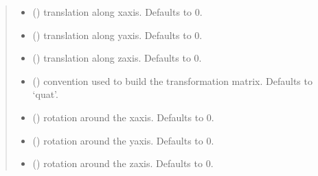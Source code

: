 \documentclass[letterpaper,10pt,english]{sphinxmanual}
\begin{document}
\begin{fulllineitems}
\begin{quote}
\begin{description}
\begin{itemize}
\item {} 
 (\sphinxstyleliteralemphasis{\sphinxupquote{, }}) \textendash{} translation along x\sphinxhyphen{}axis. Defaults to 0.

\item {} 
 (\sphinxstyleliteralemphasis{\sphinxupquote{, }}) \textendash{} translation along y\sphinxhyphen{}axis. Defaults to 0.

\item {} 
 (\sphinxstyleliteralemphasis{\sphinxupquote{, }}) \textendash{} translation along z\sphinxhyphen{}axis. Defaults to 0.

\item {} 
 (\sphinxstyleliteralemphasis{\sphinxupquote{, }}) \textendash{} convention used to build the transformation matrix. Defaults to ‘quat’.

\item {} 
 (\sphinxstyleliteralemphasis{\sphinxupquote{, }}) \textendash{} rotation around the x\sphinxhyphen{}axis. Defaults to 0.

\item {} 
 (\sphinxstyleliteralemphasis{\sphinxupquote{, }}) \textendash{} rotation around the y\sphinxhyphen{}axis. Defaults to 0.

\item {} 
 (\sphinxstyleliteralemphasis{\sphinxupquote{, }}) \textendash{} rotation around the z\sphinxhyphen{}axis. Defaults to 0.

\end{itemize}


\end{description}
\end{quote}
\end{fulllineitems}
\end{document}
